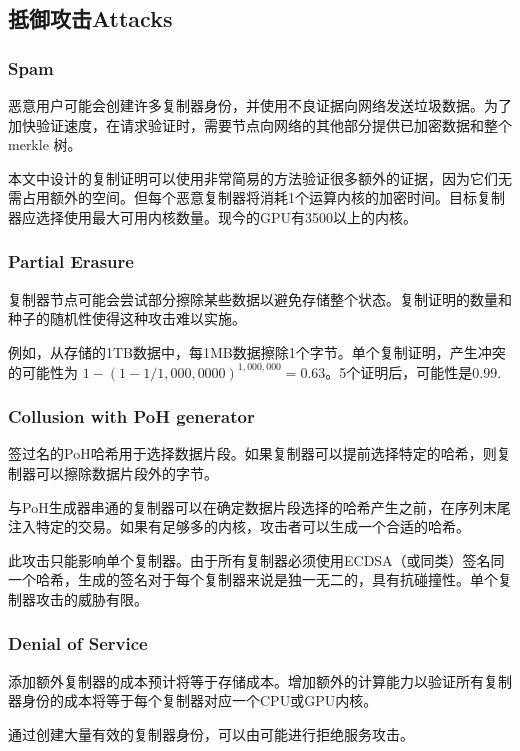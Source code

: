 \documentclass[12pt, uft8]{ctexart}
\begin{document}
\subsection{抵御攻击Attacks}
\subsubsection{Spam}
恶意用户可能会创建许多复制器身份，并使用不良证据向网络发送垃圾数据。为了加快验证速度，在请求验证时，需要节点向网络的其他部分提供已加密数据和整个 merkle 树。

本文中设计的复制证明可以使用非常简易的方法验证很多额外的证据，因为它们无需占用额外的空间。但每个恶意复制器将消耗1个运算内核的加密时间。目标复制器应选择使用最大可用内核数量。现今的GPU有3500以上的内核。

\subsubsection{Partial Erasure}

复制器节点可能会尝试部分擦除某些数据以避免存储整个状态。复制证明的数量和种子的随机性使得这种攻击难以实施。

例如，从存储的1TB数据中，每1MB数据擦除1个字节。单个复制证明，产生冲突的可能性为 \(1 - (1- 1/1,000,0000)^{1,000,000} = 0.63\)。5个证明后，可能性是\(0.99\).

\subsubsection{Collusion with PoH generator}

签过名的PoH哈希用于选择数据片段。如果复制器可以提前选择特定的哈希，则复制器可以擦除数据片段外的字节。

与PoH生成器串通的复制器可以在确定数据片段选择的哈希产生之前，在序列末尾注入特定的交易。如果有足够多的内核，攻击者可以生成一个合适的哈希。

此攻击只能影响单个复制器。由于所有复制器必须使用ECDSA（或同类）签名同一个哈希，生成的签名对于每个复制器来说是独一无二的，具有抗碰撞性。单个复制器攻击的威胁有限。

\subsubsection{Denial of Service}
添加额外复制器的成本预计将等于存储成本。增加额外的计算能力以验证所有复制器身份的成本将等于每个复制器对应一个CPU或GPU内核。

通过创建大量有效的复制器身份，可以由可能进行拒绝服务攻击。
\end{document}
